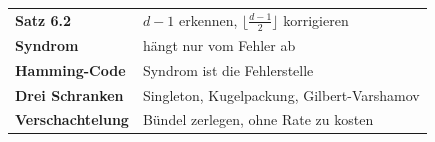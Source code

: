 \begin{merksatz}
\begin{center}
\renewcommand{\arraystretch}{1.5}
\begin{tabular}{@{}P{3.0cm}P{5.6cm}@{}}
\toprule
\textbf{Satz 6.2} & $d-1$ erkennen, $\lfloor\frac{d-1}{2}\rfloor$ korrigieren\\
\textbf{Syndrom} & hängt nur vom Fehler ab\\
\textbf{Hamming-Code} & Syndrom ist die Fehlerstelle\\
\textbf{Drei Schranken} & Singleton, Kugelpackung, Gilbert-Varshamov\\
\textbf{Verschachtelung} & Bündel zerlegen, ohne Rate zu kosten\\
\bottomrule
\end{tabular}
\end{center}

\begin{center}
\begin{minipage}{0.88\textwidth}
\end{minipage}
\end{center}
\end{merksatz}

